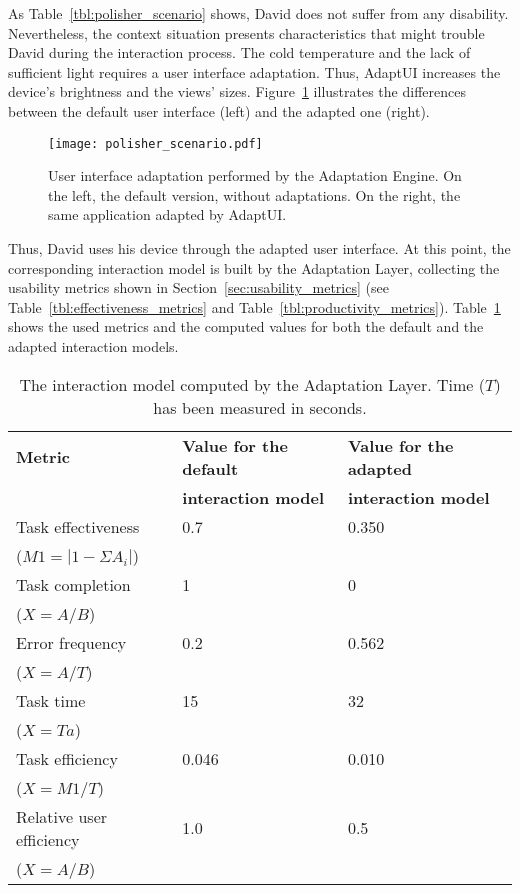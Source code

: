 As Table~\ref{tbl:polisher_scenario} shows, David does not suffer from any
disability. Nevertheless, the context situation presents characteristics that
might trouble David during the interaction process. The cold temperature and the
lack of sufficient light requires a user interface adaptation. Thus, AdaptUI
increases the device's brightness and the views' sizes. 
Figure~\ref{fig:polisher_scenario} illustrates the differences between the 
default user interface (left) and the adapted one (right).

\begin{figure}
\centering
\texttt{[image: polisher\_scenario.pdf]}
\caption{User interface adaptation performed by the Adaptation Engine. On the
left, the default version, without adaptations. On the right, the same 
application adapted by AdaptUI.}
\label{fig:polisher_scenario}
\end{figure}

Thus, David uses his device through the adapted user interface. At this point,
the corresponding interaction model is built by the Adaptation Layer, collecting
the usability metrics shown in Section~\ref{sec:usability_metrics} (see 
Table~\ref{tbl:effectiveness_metrics} and Table~\ref{tbl:productivity_metrics}).
Table~\ref{tbl:model_comparison} shows the used metrics and the computed values
for both the default and the adapted interaction models.

\begin{table}
 \caption{The interaction model computed by the Adaptation Layer. Time ($T$) has
 been measured in seconds.}
 \label{tbl:model_comparison}
 \footnotesize
 \centering
\begin{tabular}{l l l}
  \hline 
  \textbf{Metric} 	& \textbf{Value for the default}& \textbf{Value for the adapted}\\
			& \textbf{interaction model} 	& \textbf{interaction model}	\\
  \hline
  Task effectiveness	& 0.7				& 0.350	\\
  ($M1=|1-\Sigma A_{i}|$)\\
  Task completion	& 1				& 0	\\
  ($X=A/B$)\\
  Error frequency 	& 0.2				& 0.562	\\	%
  ($X=A/T$)\\
  \hline
  Task time		& 15				& 32	\\
  ($X=Ta$)\\
  Task efficiency 	& 0.046				& 0.010	\\
  ($X=M1/T$)\\
  Relative user efficiency & 1.0			& 0.5	\\
  ($X=A/B$)\\
  \hline
\end{tabular}
\end{table}

